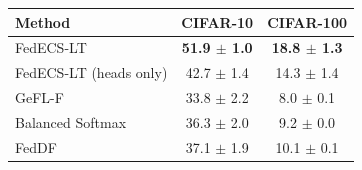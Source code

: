 \begin{tabular}{lcc}
\toprule
Method & CIFAR-10 & CIFAR-100\\
\midrule
FedECS-LT & \textbf{51.9 $\pm$ 1.0} & \textbf{18.8 $\pm$ 1.3}\\
FedECS-LT (heads only) & 42.7 $\pm$ 1.4 & 14.3 $\pm$ 1.4\\
GeFL-F & 33.8 $\pm$ 2.2 & 8.0 $\pm$ 0.1\\
Balanced Softmax & 36.3 $\pm$ 2.0 & 9.2 $\pm$ 0.0\\
FedDF & 37.1 $\pm$ 1.9 & 10.1 $\pm$ 0.1\\
\bottomrule
\end{tabular}

